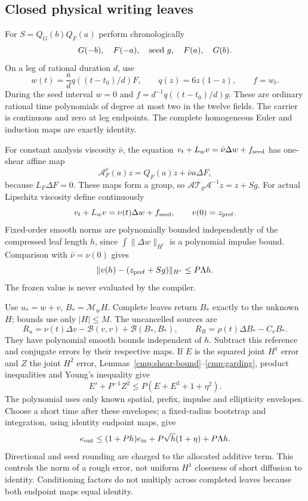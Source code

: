\documentclass[11pt,a4paper]{amsart}
\theoremstyle{definition}
\theoremstyle{remark}
\numberwithin{equation}{section}
\newcommand{\Bcal}{\mathcal B}
\begin{document}
\subsection{Closed physical writing leaves}\label{cmp:writer}

For $S=Q_G(b)Q_F(a)$ perform chronologically
\[
 G(-b),\quad F(-a),\quad\hbox{seed }g,\quad F(a),\quad G(b).
\]
On a leg of rational duration $d$, use
\[
 w(t)=\frac a d q((t-t_0)/d)F,\qquad q(z)=6z(1-z),\qquad f=w_t.
\]
During the seed interval $w=0$ and $f=d^{-1}q((t-t_0)/d)g$.
These are ordinary rational time polynomials of degree at most two in the
twelve fields. The carrier is continuous and zero at leg endpoints.
The complete homogeneous Euler and induction maps are exactly identity.

For constant analysis viscosity $\bar\nu$, the equation
$v_t+L_wv=\bar\nu\Delta w+f_{\rm seed}$ has one-shear affine map
\[
 \mathcal A_F^{\bar\nu}(a)z=Q_F(a)z+\bar\nu a\Delta F,
\]
because $L_F\Delta F=0$. These maps form a group, so
$\mathcal A\mathcal T_g\mathcal A^{-1}z=z+Sg$.
For actual Lipschitz viscosity define continuously
\begin{equation}
 v_t+L_wv=\nu(t)\Delta w+f_{\rm seed},\qquad v(0)=z_{\rm pref}.
 \label{cmp:writer-reference}
\end{equation}
Fixed-order smooth norms are polynomially bounded independently of the
compressed leaf length $h$, since $\int\|\Delta w\|_{H^r}$ is a polynomial
impulse bound. Comparison with $\bar\nu=\nu(0)$ gives
\begin{equation}
 \|v(h)-(z_{\rm pref}+Sg)\|_{H^r}\le P\Lambda h.
 \label{cmp:writer-profile}
\end{equation}
The frozen value is never evaluated by the compiler.

Use $u_*=w+v$, $B_*=\mathcal M_wH$. Complete leaves return $B_*$ exactly
to the unknown $H$; bounds use only $|H|\le M$. The uncancelled sources are
\[
 R_u=\nu(t)\Delta v-\Bcal(v,v)+\Bcal(B_*,B_*),\qquad
 R_B=\rho(t)\Delta B_*-C_vB_*.
\]
They have polynomial smooth bounds independent of $h$.
Subtract this reference and conjugate errors by their respective maps.
If $E$ is the squared joint $H^1$ error and $Z$ the joint $H^2$ error,
Lemmas~\ref{cmp:shear-bound}--\ref{cmp:garding}, product inequalities and
Young's inequality give
\begin{equation}
 E'+P^{-1}Z^2\le P(E+E^3+1+\eta^2).\label{cmp:leaf-energy}
\end{equation}
The polynomial uses only known spatial, prefix, impulse and ellipticity
envelopes. Choose a short time after these envelopes; a fixed-radius
bootstrap and integration, using identity endpoint maps, give
\begin{equation}
 e_{\rm out}\le(1+Ph)e_{\rm in}+P\sqrt h(1+\eta)+P\Lambda h.
 \label{cmp:leaf-estimate}
\end{equation}
Directional and seed rounding are charged to the allocated additive term.
This controls the norm of a rough error, not uniform $H^1$ closeness of
short diffusion to identity. Conditioning factors do not multiply across
completed leaves because both endpoint maps equal identity.
\end{document}
